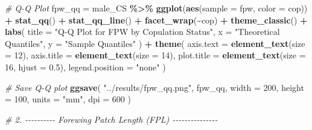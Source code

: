 \documentclass[
]{article}
\newenvironment{Shaded}{\begin{snugshade}}{\end{snugshade}}
\newcommand{\AttributeTok}[1]{\textcolor[rgb]{0.13,0.29,0.53}{#1}}
\newcommand{\CommentTok}[1]{\textcolor[rgb]{0.56,0.35,0.01}{\textit{#1}}}
\newcommand{\DecValTok}[1]{\textcolor[rgb]{0.00,0.00,0.81}{#1}}
\newcommand{\FloatTok}[1]{\textcolor[rgb]{0.00,0.00,0.81}{#1}}
\newcommand{\FunctionTok}[1]{\textcolor[rgb]{0.13,0.29,0.53}{\textbf{#1}}}
\newcommand{\NormalTok}[1]{#1}
\newcommand{\OtherTok}[1]{\textcolor[rgb]{0.56,0.35,0.01}{#1}}
\newcommand{\SpecialCharTok}[1]{\textcolor[rgb]{0.81,0.36,0.00}{\textbf{#1}}}
\newcommand{\StringTok}[1]{\textcolor[rgb]{0.31,0.60,0.02}{#1}}
\begin{document}
\begin{Shaded}
\begin{Highlighting}[]
\CommentTok{\# Q{-}Q Plot}
\NormalTok{fpw\_qq }\OtherTok{=}\NormalTok{ male\_CS }\SpecialCharTok{\%\textgreater{}\%}
  \FunctionTok{ggplot}\NormalTok{(}\FunctionTok{aes}\NormalTok{(}\AttributeTok{sample =}\NormalTok{ fpw, }\AttributeTok{color =}\NormalTok{ cop)) }\SpecialCharTok{+}
  \FunctionTok{stat\_qq}\NormalTok{() }\SpecialCharTok{+}
  \FunctionTok{stat\_qq\_line}\NormalTok{() }\SpecialCharTok{+}
  \FunctionTok{facet\_wrap}\NormalTok{(}\SpecialCharTok{\textasciitilde{}}\NormalTok{cop) }\SpecialCharTok{+}
  \FunctionTok{theme\_classic}\NormalTok{() }\SpecialCharTok{+}
  \FunctionTok{labs}\NormalTok{(}
    \AttributeTok{title =} \StringTok{"Q{-}Q Plot for FPW by Copulation Status"}\NormalTok{,}
    \AttributeTok{x =} \StringTok{"Theoretical Quantiles"}\NormalTok{,}
    \AttributeTok{y =} \StringTok{"Sample Quantiles"}
\NormalTok{  ) }\SpecialCharTok{+}
  \FunctionTok{theme}\NormalTok{(}
    \AttributeTok{axis.text =} \FunctionTok{element\_text}\NormalTok{(}\AttributeTok{size =} \DecValTok{12}\NormalTok{),}
    \AttributeTok{axis.title =} \FunctionTok{element\_text}\NormalTok{(}\AttributeTok{size =} \DecValTok{14}\NormalTok{),}
    \AttributeTok{plot.title =} \FunctionTok{element\_text}\NormalTok{(}\AttributeTok{size =} \DecValTok{16}\NormalTok{, }\AttributeTok{hjust =} \FloatTok{0.5}\NormalTok{),}
    \AttributeTok{legend.position =} \StringTok{"none"}
\NormalTok{  )}

\CommentTok{\# Save Q{-}Q plot}
\FunctionTok{ggsave}\NormalTok{(}
  \StringTok{"../results/fpw\_qq.png"}\NormalTok{,}
\NormalTok{  fpw\_qq,}
  \AttributeTok{width =} \DecValTok{200}\NormalTok{,}
  \AttributeTok{height =} \DecValTok{100}\NormalTok{,}
  \AttributeTok{units =} \StringTok{"mm"}\NormalTok{,}
  \AttributeTok{dpi =} \DecValTok{600}
\NormalTok{)}

\CommentTok{\# 2. {-}{-}{-}{-}{-}{-}{-}{-}{-}{-} Forewing Patch Length (FPL) {-}{-}{-}{-}{-}{-}{-}{-}{-}{-}{-}{-}{-}{-}{-}}


\end{Highlighting}
\end{Shaded}
\end{document}
